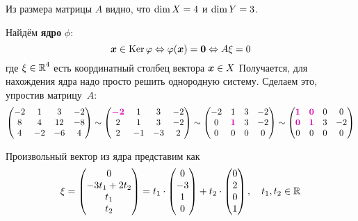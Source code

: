 \documentclass[a4paper,12pt]{article}
\begin{document}
  \begin{solution}
    Из размера матрицы $A$ видно, что $\dim X \hm= 4$ и $\dim Y \hm= 3$.
    
    Найдём \textbf{ядро} $\phi$:
    \[
      \boldsymbol x \in \operatorname{Ker}\varphi \Leftrightarrow \varphi(\boldsymbol x) = \boldsymbol 0 \Leftrightarrow A \xi = 0
    \]
    где $\xi \hm\in \RR^4$ есть координатный столбец вектора $\boldsymbol x \in X$
    Получается, для нахождения ядра надо просто решить однородную систему.
    Сделаем это, упростив матрицу~$A$:
    \begin{equation}\label{p-23-29-gauss}
    \begin{split}
      \begin{pmatrix}
        -2 & 1 & 3 & -2\\
         8 & 4 & 12 & -8\\
         4 & -2 & -6 & 4
      \end{pmatrix}
      \sim \begin{pmatrix}
        \textcolor{pink}{\bds {-2}} &  1 &  3 & -2\\
        2                           &  1 &  3 & -2\\
        2                           & -1 & -3 & 2
      \end{pmatrix}
      \sim \begin{pmatrix}
        -2 & 1                        & 3 & -2\\
         0 & \textcolor{pink}{\bds 1} & 3 & -2\\
         0 & 0                        & 0 & 0
      \end{pmatrix}
      \sim \begin{pmatrix}
        \textcolor{pink}{\bds 1} & \textcolor{pink}{\bds 0} & 0 & 0\\
        \textcolor{pink}{\bds 0} & \textcolor{pink}{\bds 1} & 3 & -2\\
                              0  &                       0  & 0 & 0
      \end{pmatrix}
    \end{split}
    \end{equation}
    
    Произвольный вектор из ядра представим как
    \[
      \xi = \begin{pmatrix}
        0 \\ -3t_1 + 2t_2 \\ t_1 \\ t_2
      \end{pmatrix} = t_1 \cdot \begin{pmatrix}
        0 \\ -3 \\ 1 \\ 0
      \end{pmatrix} + t_2 \cdot \begin{pmatrix}
        0 \\ 2 \\ 0 \\ 1
      \end{pmatrix},\quad t_1, t_2 \in \operatorname{\mathbb R}
    \]
    

\end{solution}
\end{document}
